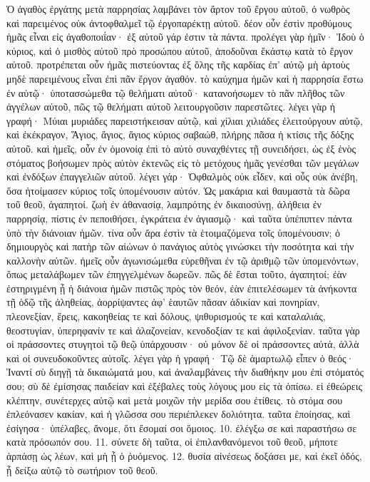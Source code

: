 Ὁ ἀγαθὸς ἐργάτης μετὰ παρρησίας λαμβάνει τὸν ἄρτον τοῦ ἔργου αὐτοῦ, ὁ νωθρὸς καὶ παρειμένος οὐκ ἀντοφθαλμεῖ τῷ ἐργοπαρέκτῃ αὐτοῦ. δέον οὖν ἐστὶν προθύμους ἡμᾶς εἶναι εἰς ἀγαθοποιΐαν· ἐξ αὐτοῦ γάρ ἐστιν τὰ πάντα. προλέγει γὰρ ἡμῖν· Ἰδοὺ ὁ κύριος, καὶ ὁ μισθὸς αὐτοῦ πρὸ προσώπου αὐτοῦ, ἀποδοῦναι ἕκάστῳ κατὰ τὸ ἔργον αὐτοῦ. προτρέπεται οὖν ἡμᾶς πιστεύοντας ἐξ ὅλης τῆς καρδίας ἐπ’ αὐτῷ μὴ ἀρτοὺς μηδὲ παρειμένους εἶναι ἐπὶ πᾶν ἔργον ἀγαθόν. τὸ καύχημα ἡμῶν καὶ ἡ παρρησία ἔστω ἐν αὐτῷ· ὑποτασσώμεθα τῷ θελήματι αὐτοῦ· κατανοήσωμεν τὸ πᾶν πλῆθος τῶν ἀγγέλων αὐτοῦ, πῶς τῷ θελήματι αὐτοῦ λειτουργοῦσιν παρεστῶτες. λέγει γὰρ ἡ γραφή· Μύιαι μυριάδες παρειστήκεισαν αὐτῷ, καὶ χίλιαι χιλιάδες ἐλειτούργουν αὐτῷ, καὶ ἐκέκραγον, Ἅγιος, ἅγιος, ἅγιος κύριος σαβαώθ, πλήρης πᾶσα ἡ κτίσις τῆς δόξης αὐτοῦ. καὶ ἡμεῖς, οὖν ἐν ὁμονοίᾳ ἐπὶ τὸ αὐτὸ συναχθέντες τῇ συνειδήσει, ὡς ἐξ ἑνὸς στόματος βοήσωμεν πρὸς αὐτὸν ἐκτενῶς εἰς τὸ μετόχους ἡμᾶς γενέσθαι τῶν μεγάλων καὶ ἐνδόξων ἐπαγγελιῶν αὐτοῦ. λέγει γάρ· Ὀφθαλμὸς οὐκ εἶδεν, καὶ οὖς οὐκ ἀνέβη, ὅσα ἡτοίμασεν κύριος τοῖς ὑπομένουσιν αὐτόν.
Ὡς μακάρια καὶ θαυμαστὰ τὰ δῶρα τοῦ θεοῦ, ἀγαπητοί. ζωὴ ἐν ἀθανασίᾳ, λαμπρότης ἐν δικαιοσύνῃ, ἀλήθεια ἐν παρρησίᾳ, πίστις ἐν πεποιθήσει, ἐγκράτεια ἐν ἁγιασμῷ· καὶ ταῦτα ὑπέπιπτεν πάντα ὑπὸ τὴν διάνοιαν ἡμῶν. τίνα οὖν ἄρα ἐστὶν τὰ ἑτοιμαζόμενα τοῖς ὑπομένουσιν; ὁ δημιουργὸς καὶ πατὴρ τῶν αἰώνων ὁ πανάγιος αὐτὸς γινώσκει τὴν ποσότητα καὶ τὴν καλλονὴν αὐτῶν. ἡμεῖς οὖν ἀγωνισώμεθα εὑρεθῆναι ἐν τῷ ἀριθμῷ τῶν ὑπομενόντων, ὅπως μεταλάβωμεν τῶν ἐπηγγελμένων δωρεῶν. πῶς δὲ ἔσται τοῦτο, ἀγαπητοί; ἐὰν ἐστηριγμένη ᾖ ἡ διάνοια ἡμῶν πιστῶς πρὸς τὸν θεόν, ἐὰν ἐπιτελέσωμεν τὰ ἀνήκοντα τῇ ὁδῷ τῆς ἀληθείας, ἀορρίψαντες ἀφ’ ἑαυτῶν πᾶσαν ἀδικίαν καὶ πονηρίαν, πλεονεξίαν, ἔρεις, κακοηθείας τε καὶ δόλους, ψιθυρισμούς τε καὶ καταλαλιάς, θεοστυγίαν, ὑπερηφανίν τε καὶ ἀλαζονείαν, κενοδοξίαν τε καὶ ἀφιλοξενίαν. ταῦτα γὰρ οἱ πράσσοντες στυγητοὶ τῷ θεῷ ὑπάρχουσιν· οὐ μόνον δὲ οἱ πράσσοντες αὐτά, ἀλλὰ καὶ οἱ συνευδοκοῦντες αὐτοῖς. λέγει γὰρ ἡ γραφή· Τῷ δὲ ἁμαρτωλῷ εἶπεν ὁ θεός· Ἱναντί σὺ διηγῇ τὰ δικαιώματά μου, καὶ ἀναλαμβάνεις τὴν διαθήκην μου ἐπὶ στόματός σου; σὺ δὲ ἐμίσησας παιδείαν καὶ ἐξέβαλες τοὺς λόγους μου εἰς τὰ ὀπίσω. εἰ ἐθεώρεις κλέπτην, συνέτερχες αὐτῷ καὶ μετὰ μοιχῶν τὴν μερίδα σου ἐτίθεις. τὸ στόμα σου ἐπλεόνασεν κακίαν, καὶ ἡ γλῶσσα σου περιέπλεκεν δολιότητα. ταῦτα ἐποίησας, καὶ ἐσίγησα· ὑπέλαβες, ἄνομε, ὅτι ἔσομαί σοι ὅμοιος. 10. ἐλέγξω σε καὶ παραστήσω σε κατὰ πρόσωπόν σου. 11. σύνετε δὴ ταῦτα, οἱ ἐπιλανθανόμενοι τοῦ θεοῦ, μήποτε ἁρπάσῃ ὡς λέων, καὶ μὴ ᾖ ὁ ῥυόμενος. 12. θυσία αἰνέσεως δοξάσει με, καὶ ἐκεῖ ὁδός, ᾗ δείξω αὐτῷ τὸ σωτήριον τοῦ θεοῦ.
